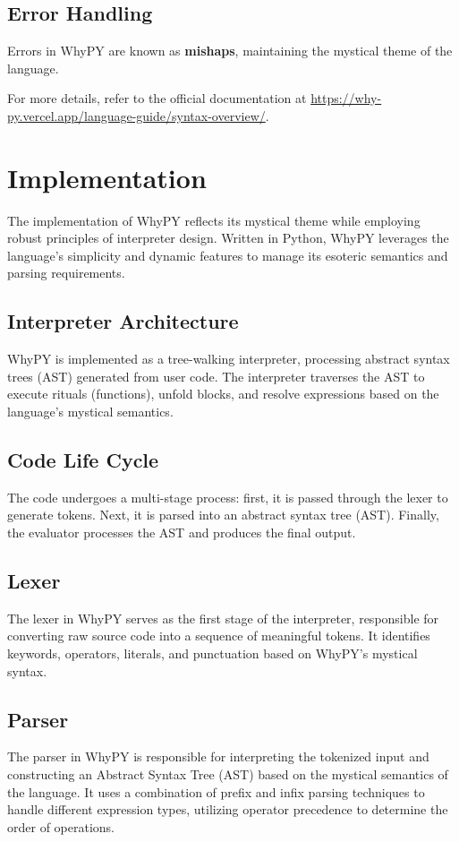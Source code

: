 \documentclass[conference]{IEEEtran}
\begin{document}
\subsection{Error Handling}
Errors in WhyPY are known as \textbf{mishaps}, maintaining the mystical theme of the language.

For more details, refer to the official documentation at \url{https://why-py.vercel.app/language-guide/syntax-overview/}.



\section{Implementation}
The implementation of WhyPY reflects its mystical theme while employing robust principles of interpreter design. Written in Python, WhyPY leverages the language's simplicity and dynamic features to manage its esoteric semantics and parsing requirements.

\subsection{Interpreter Architecture}
WhyPY is implemented as a tree-walking interpreter, processing abstract syntax trees (AST) generated from user code. The interpreter traverses the AST to execute rituals (functions), unfold blocks, and resolve expressions based on the language’s mystical semantics.

\subsection{Code Life Cycle}
The code undergoes a multi-stage process: first, it is passed through the lexer to generate tokens. Next, it is parsed into an abstract syntax tree (AST). Finally, the evaluator processes the AST and produces the final output.

\subsection{Lexer}
The lexer in WhyPY serves as the first stage of the interpreter, responsible for converting raw source code into a sequence of meaningful tokens. It identifies keywords, operators, literals, and punctuation based on WhyPY's mystical syntax.

\subsection{Parser}
The parser in WhyPY is responsible for interpreting the tokenized input and constructing an Abstract Syntax Tree (AST) based on the mystical semantics of the language. It uses a combination of prefix and infix parsing techniques to handle different expression types, utilizing operator precedence to determine the order of operations.
\end{document}
